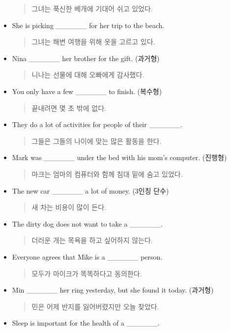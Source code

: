\documentclass{article}
\begin{document}
\begin{addmargin}[1em]{1em}
\begin{itemize}
    \begin{quote}
    그녀는 푹신한 베개에 기대어 쉬고 있었다.
    \end{quote}
    \item She is picking \_\_\_\_\_\_ for her trip to the beach.
    \begin{quote}
    그녀는 해변 여행을 위해 옷을 고르고 있다.
    \end{quote}
    \item Nina \_\_\_\_\_\_ her brother for the gift. (과거형)
    \begin{quote}
    니나는 선물에 대해 오빠에게 감사했다.
    \end{quote}
    \item You only have a few \_\_\_\_\_\_ to finish. (복수형)
    \begin{quote}
    끝내려면 몇 초 밖에 없다.
    \end{quote}
    \item They do a lot of activities for people of their \_\_\_\_\_\_.
    \begin{quote}
    그들은 그들의 나이에 맞는 많은 활동을 한다.
    \end{quote}
    \newpage
    \item Mark was \_\_\_\_\_\_ under the bed with his mom's computer. (진행형)
    \begin{quote}
    마크는 엄마의 컴퓨터와 함께 침대 밑에 숨고 있었다.
    \end{quote}
    \item The new car \_\_\_\_\_\_ a lot of money. (3인칭 단수)
    \begin{quote}
    새 차는 비용이 많이 든다.
    \end{quote}
    \item The dirty dog does not want to take a \_\_\_\_\_\_.
    \begin{quote}
    더러운 개는 목욕을 하고 싶어하지 않는다.
    \end{quote}
    \item Everyone agrees that Mike is a \_\_\_\_\_\_ person.
    \begin{quote}
    모두가 마이크가 똑똑하다고 동의한다.
    \end{quote}
    \item Min \_\_\_\_\_\_ her ring yesterday, but she found it today. (과거형)
    \begin{quote}
    민은 어제 반지를 잃어버렸지만 오늘 찾았다.
    \end{quote}
    \item Sleep is important for the health of a \_\_\_\_\_\_.

\end{itemize}
\end{addmargin}
\end{document}
